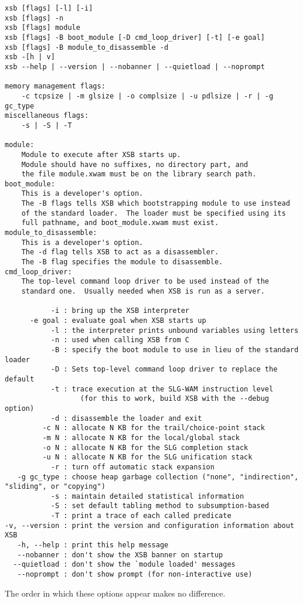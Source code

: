 {\small 
\begin{verbatim}
xsb [flags] [-l] [-i]
xsb [flags] -n
xsb [flags] module
xsb [flags] -B boot_module [-D cmd_loop_driver] [-t] [-e goal]
xsb [flags] -B module_to_disassemble -d
xsb -[h | v]
xsb --help | --version | --nobanner | --quietload | --noprompt

memory management flags:
    -c tcpsize | -m glsize | -o complsize | -u pdlsize | -r | -g gc_type
miscellaneous flags:
    -s | -S | -T

module:
    Module to execute after XSB starts up.
    Module should have no suffixes, no directory part, and
    the file module.xwam must be on the library search path.
boot_module:
    This is a developer's option.
    The -B flags tells XSB which bootstrapping module to use instead
    of the standard loader.  The loader must be specified using its
    full pathname, and boot_module.xwam must exist.
module_to_disassemble:
    This is a developer's option.
    The -d flag tells XSB to act as a disassembler.
    The -B flag specifies the module to disassemble.
cmd_loop_driver:
    The top-level command loop driver to be used instead of the
    standard one.  Usually needed when XSB is run as a server.

           -i : bring up the XSB interpreter
      -e goal : evaluate goal when XSB starts up
           -l : the interpreter prints unbound variables using letters
           -n : used when calling XSB from C
           -B : specify the boot module to use in lieu of the standard loader
           -D : Sets top-level command loop driver to replace the default
           -t : trace execution at the SLG-WAM instruction level
                  (for this to work, build XSB with the --debug option)
           -d : disassemble the loader and exit
         -c N : allocate N KB for the trail/choice-point stack
         -m N : allocate N KB for the local/global stack
         -o N : allocate N KB for the SLG completion stack
         -u N : allocate N KB for the SLG unification stack
           -r : turn off automatic stack expansion
   -g gc_type : choose heap garbage collection ("none", "indirection", "sliding", or "copying") 
           -s : maintain detailed statistical information
           -S : set default tabling method to subsumption-based
           -T : print a trace of each called predicate
-v, --version : print the version and configuration information about XSB
   -h, --help : print this help message
   --nobanner : don't show the XSB banner on startup
  --quietload : don't show the `module loaded' messages
   --noprompt : don't show prompt (for non-interactive use)

\end{verbatim}
}
The order in which these options appear makes no difference.

